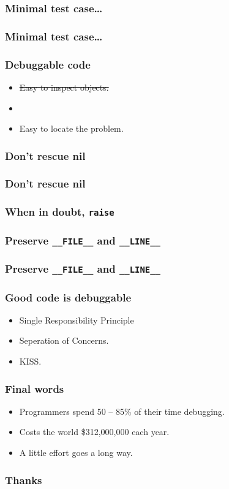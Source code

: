 \documentclass[14pt]{beamer}
\newlength{\wideitemsep}
\let\olditem\item
\renewcommand{\item}{\setlength{\itemsep}{\wideitemsep}\olditem}
\begin{document}
\begin{frame}[fragile]
  \frametitle{Minimal test case\ldots}
  
\end{frame}

\begin{frame}[fragile]
  \frametitle{Minimal test case\ldots}
  
\end{frame}

\frame
{
  \frametitle{Debuggable code}

  \begin{itemize}
  \item \sout{Easy to inspect objects.}
  \item {}
  \item Easy to locate the problem.
  \end{itemize}
}

\frame
{
  \frametitle{Don't rescue nil}

  \small
  
}
\frame
{
  \frametitle{Don't rescue nil}

  \small
  
}

\frame
{
  \frametitle{When in doubt, \texttt{raise}}

  \small
  
}

\frame
{
  \frametitle{Preserve \texttt{\_\_FILE\_\_} and \texttt{\_\_LINE\_\_}}

  \small
  
}

\frame
{
  \frametitle{Preserve \texttt{\_\_FILE\_\_} and \texttt{\_\_LINE\_\_}}

  \small
  
}

\frame
{
  \frametitle{Good code is debuggable}

  \begin{itemize}
  \item Single Responsibility Principle
  \item Seperation of Concerns.
  \item KISS.
  \end{itemize}
}

\frame
{
  \frametitle{Final words}

  \begin{itemize}
  \item Programmers spend 50 -- 85\% of their time debugging.
  \item Costs the world \$312,000,000 each year.
  \item A little effort goes a long way.
  \end{itemize}

}

\frame
{
  \frametitle{Thanks}


}
\end{document}
